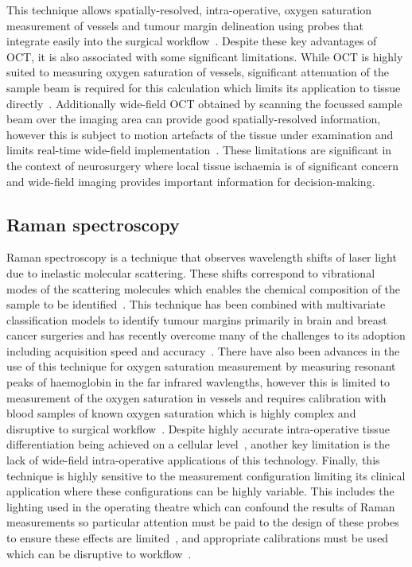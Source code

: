 This technique allows spatially-resolved, intra-operative, oxygen saturation measurement of vessels and tumour margin delineation using probes that integrate easily into the surgical workflow~\cite{Jansen2018}. Despite these key advantages of OCT, it is also associated with some significant limitations. While OCT is highly suited to measuring oxygen saturation of vessels, significant attenuation of the sample beam is required for this calculation which limits its application to tissue directly~\cite{Shu2017}. Additionally wide-field OCT obtained by scanning the focussed sample beam over the imaging area can provide good spatially-resolved information, however this is subject to motion artefacts of the tissue under examination and limits real-time wide-field implementation~\cite{Yu2015}. These limitations are significant in the context of neurosurgery where local tissue ischaemia is of significant concern and wide-field imaging provides important information for decision-making. 

\subsection{Raman spectroscopy}
Raman spectroscopy is a technique that observes wavelength shifts of laser light due to inelastic molecular scattering. These shifts correspond to vibrational modes of the scattering molecules which enables the chemical composition of the sample to be identified~\cite{Kong2015}. This technique has been combined with multivariate classification models to identify tumour margins primarily in brain and breast cancer surgeries and has recently overcome many of the challenges to its adoption including acquisition speed and accuracy~\cite{Kong2015, Fitzgerald2022}. There have also been advances in the use of this technique for oxygen saturation measurement by measuring resonant peaks of haemoglobin in the far infrared wavlengths, however this is limited to measurement of the oxygen saturation in vessels and requires calibration with blood samples of known oxygen saturation which is highly complex and disruptive to surgical workflow~\cite{TorresFilho2016}. Despite highly accurate intra-operative tissue differentiation being achieved on a cellular level~\cite{Fitzgerald2022}, another key limitation is the lack of wide-field intra-operative applications of this technology. Finally, this technique is highly sensitive to the measurement configuration limiting its clinical application where these configurations can be highly variable. This includes the lighting used in the operating theatre which can confound the results of Raman measurements so particular attention must be paid to the design of these probes to ensure these effects are limited~\cite{Horsnell2016}, and appropriate calibrations must be used which can be disruptive to workflow~\cite{TorresFilho2016}.

